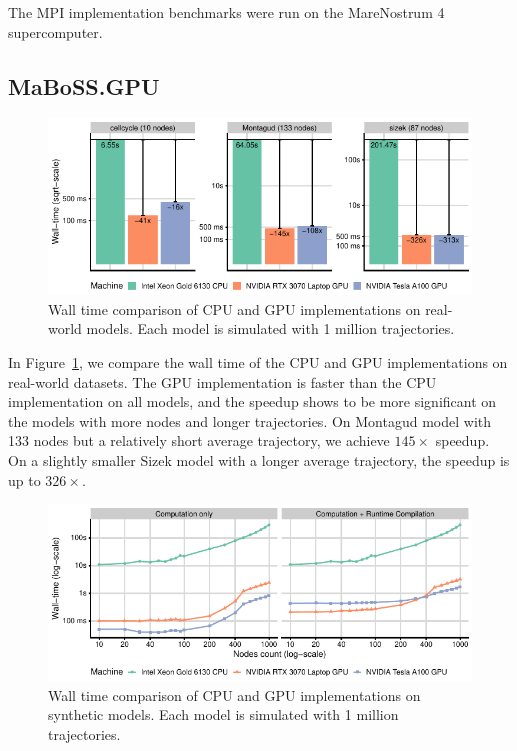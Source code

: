 \documentclass[times, twoside]{zHenriquesLab-StyleBioRxiv}
\begin{document}
The MPI implementation benchmarks were run on the MareNostrum 4 supercomputer.


\subsection*{MaBoSS.GPU}

\begin{figure}
    \centering
    \includegraphics[width=\linewidth]{Figures/real.pdf}
    \caption{Wall time comparison of CPU and GPU implementations on real-world models. Each model is simulated with 1 million trajectories.}
    \label{fig:real}
\end{figure}

In Figure~\ref{fig:real}, we compare the wall time of the CPU and GPU implementations on real-world datasets. The GPU implementation is faster than the CPU implementation on all models, and the speedup shows to be more significant on the models with more nodes and longer trajectories. On Montagud model with 133 nodes but a relatively short average trajectory, we achieve $145\times$ speedup. On a slightly smaller Sizek model with a longer average trajectory, the speedup is up to $326\times$. 

\begin{figure}
    \centering
    \includegraphics[width=\linewidth]{Figures/nodes.pdf}
    \caption{Wall time comparison of CPU and GPU implementations on synthetic models. Each model is simulated with 1 million trajectories.}
    \label{fig:synth}
\end{figure}
\end{document}
